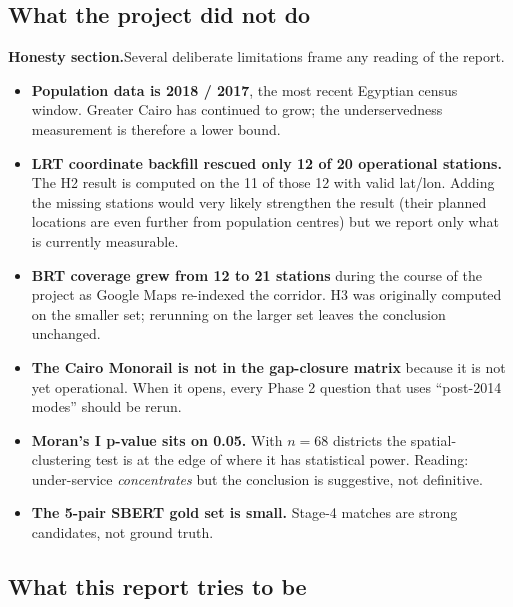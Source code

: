 
\subsection{What the project did not do}

\begin{warningbox}
\textbf{\color{plotorange}Honesty section.}\quad Several deliberate
limitations frame any reading of the report.

\begin{itemize}
 \item \textbf{Population data is 2018 / 2017}, the most recent
 Egyptian census window. Greater Cairo has continued to grow;
 the underservedness measurement is therefore a lower bound.
 \item \textbf{LRT coordinate backfill rescued only 12 of 20
 operational stations.} The H2 result is computed on the 11 of
 those 12 with valid lat/lon. Adding the missing stations would
 very likely strengthen the result (their planned locations are
 even further from population centres) but we report only what
 is currently measurable.
 \item \textbf{BRT coverage grew from 12 to 21 stations} during the
 course of the project as Google Maps re-indexed the corridor.
 H3 was originally computed on the smaller set; rerunning on
 the larger set leaves the conclusion unchanged.
 \item \textbf{The Cairo Monorail is not in the gap-closure matrix}
 because it is not yet operational. When it opens, every Phase
 2 question that uses ``post-2014 modes'' should be rerun.
 \item \textbf{Moran's I p-value sits on 0.05.} With $n = 68$ districts
 the spatial-clustering test is at the edge of where it has
 statistical power. Reading: under-service \emph{concentrates}
 but the conclusion is suggestive, not definitive.
 \item \textbf{The 5-pair SBERT gold set is small.} Stage-4 matches
 are strong candidates, not ground truth.
\end{itemize}
\end{warningbox}

\subsection{What this report tries to be}

